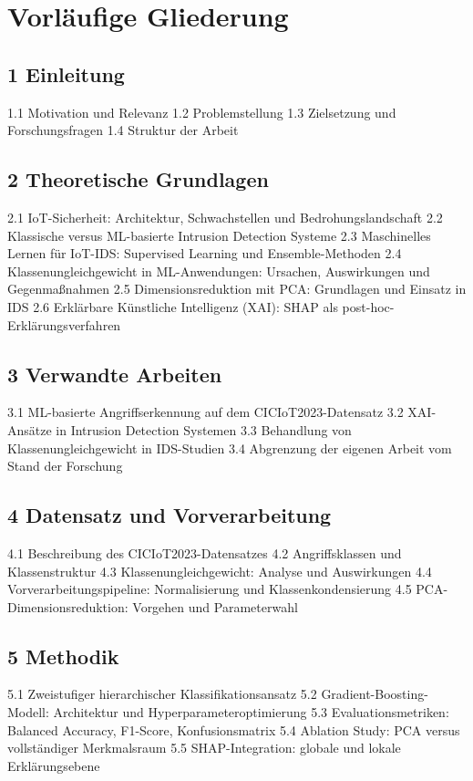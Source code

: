 \section{Vorläufige Gliederung}\label{gliederung}

\subsection{1 Einleitung}
1.1 Motivation und Relevanz
1.2 Problemstellung
1.3 Zielsetzung und Forschungsfragen
1.4 Struktur der Arbeit

\subsection{2 Theoretische Grundlagen}
2.1 IoT-Sicherheit: Architektur, Schwachstellen und Bedrohungslandschaft
2.2 Klassische versus ML-basierte Intrusion Detection Systeme
2.3 Maschinelles Lernen für IoT-IDS: Supervised Learning und Ensemble-Methoden
2.4 Klassenungleichgewicht in ML-Anwendungen: Ursachen, Auswirkungen und Gegenmaßnahmen
2.5 Dimensionsreduktion mit PCA: Grundlagen und Einsatz in IDS
2.6 Erklärbare Künstliche Intelligenz (XAI): SHAP als post-hoc-Erklärungsverfahren

\subsection{3 Verwandte Arbeiten}
3.1 ML-basierte Angriffserkennung auf dem CICIoT2023-Datensatz
3.2 XAI-Ansätze in Intrusion Detection Systemen
3.3 Behandlung von Klassenungleichgewicht in IDS-Studien
3.4 Abgrenzung der eigenen Arbeit vom Stand der Forschung

\subsection{4 Datensatz und Vorverarbeitung}
4.1 Beschreibung des CICIoT2023-Datensatzes
4.2 Angriffsklassen und Klassenstruktur
4.3 Klassenungleichgewicht: Analyse und Auswirkungen
4.4 Vorverarbeitungspipeline: Normalisierung und Klassenkondensierung
4.5 PCA-Dimensionsreduktion: Vorgehen und Parameterwahl

\subsection{5 Methodik}
5.1 Zweistufiger hierarchischer Klassifikationsansatz
5.2 Gradient-Boosting-Modell: Architektur und Hyperparameteroptimierung
5.3 Evaluationsmetriken: Balanced Accuracy, F1-Score, Konfusionsmatrix
5.4 Ablation Study: PCA versus vollständiger Merkmalsraum
5.5 SHAP-Integration: globale und lokale Erklärungsebene

